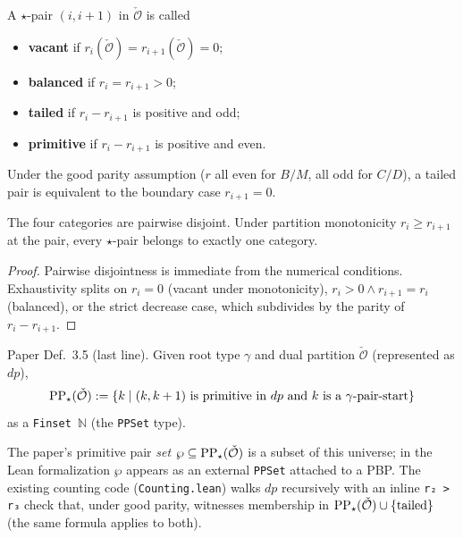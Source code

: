 \begin{definition}
  \label{def:pair_status}
  \leanok
  A $\star$-pair $(i, i+1)$ in $\check{\mathcal{O}}$ is called
  \begin{itemize}
    \item \textbf{vacant} if $r_i(\check{\mathcal{O}}) = r_{i+1}(\check{\mathcal{O}}) = 0$;
    \item \textbf{balanced} if $r_i = r_{i+1} > 0$;
    \item \textbf{tailed} if $r_i - r_{i+1}$ is positive and odd;
    \item \textbf{primitive} if $r_i - r_{i+1}$ is positive and even.
  \end{itemize}
  Under the good parity assumption ($r$ all even for $B/M$, all odd for $C/D$), a tailed pair is equivalent to the boundary case $r_{i+1} = 0$.
\end{definition}

\begin{lemma}
  \label{lem:pair_status_dichotomy}
  \leanok
  The four categories are pairwise disjoint. Under partition monotonicity $r_i \geq r_{i+1}$ at the pair, every $\star$-pair belongs to exactly one category.
\end{lemma}
\begin{proof}
  \leanok
  Pairwise disjointness is immediate from the numerical conditions. Exhaustivity splits on $r_i = 0$ (vacant under monotonicity), $r_i > 0 \land r_{i+1} = r_i$ (balanced), or the strict decrease case, which subdivides by the parity of $r_i - r_{i+1}$.
\end{proof}

\begin{definition}
  \label{def:PP_star}
  \leanok
  Paper Def.~3.5 (last line). Given root type $\gamma$ and dual partition $\check{\mathcal{O}}$ (represented as $dp$),
  \[
    \mathrm{PP}_\star(\check{\mathcal{O}}) := \{ k \mid (k, k+1) \text{ is primitive in } dp \text{ and } k \text{ is a } \gamma\text{-pair-start} \}
  \]
  as a \texttt{Finset\ $\mathbb{N}$} (the \texttt{PPSet} type).

  The paper's primitive pair \emph{set} $\wp \subseteq \mathrm{PP}_\star(\check{\mathcal{O}})$ is a subset of this universe; in the Lean formalization $\wp$ appears as an external \texttt{PPSet} attached to a PBP. The existing counting code (\texttt{Counting.lean}) walks $dp$ recursively with an inline \texttt{r₂ > r₃} check that, under good parity, witnesses membership in $\mathrm{PP}_\star(\check{\mathcal{O}}) \cup \{\text{tailed}\}$ (the same formula applies to both).
\end{definition}

